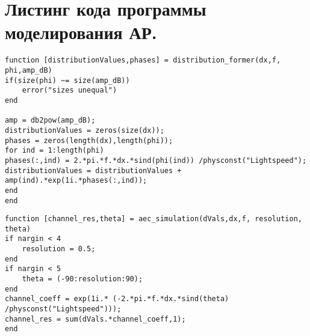 \section{Листинг кода программы моделирования АР.}%
\label{appendix:arrays-code-appendix}

\begin{verbatim}
function [distributionValues,phases] = distribution_former(dx,f, phi,amp_dB)
if(size(phi) ~= size(amp_dB))
    error("sizes unequal")
end

amp = db2pow(amp_dB);
distributionValues = zeros(size(dx));
phases = zeros(length(dx),length(phi));
for ind = 1:length(phi)
phases(:,ind) = 2.*pi.*f.*dx.*sind(phi(ind)) /physconst("Lightspeed");
distributionValues = distributionValues + amp(ind).*exp(1i.*phases(:,ind));
end
end    
\end{verbatim}


\begin{verbatim}
function [channel_res,theta] = aec_simulation(dVals,dx,f, resolution, theta)
if nargin < 4
    resolution = 0.5;
end
if nargin < 5
    theta = (-90:resolution:90);
end
channel_coeff = exp(1i.* (-2.*pi.*f.*dx.*sind(theta) /physconst("Lightspeed")));
channel_res = sum(dVals.*channel_coeff,1);
end 
\end{verbatim}